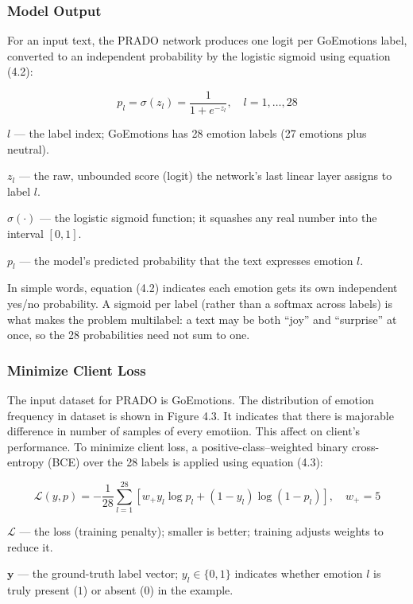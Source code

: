 \subsubsection{Model Output}
For an input text, the PRADO network produces one logit  per GoEmotions label, converted to an independent probability by the logistic sigmoid using equation (4.2):

\begin{equation}
  p_{l} = \sigma(z_{l}) = \frac{1}{1 + e^{-z_{l}}}, \quad l = 1, \ldots, 28
  \label{eq:ch4_4_2}
\end{equation}

$l$ --- the label index; GoEmotions has 28 emotion labels (27 emotions plus neutral).

$z_{l}$ --- the raw, unbounded score (logit) the network’s last linear layer assigns to label $l$.

$\sigma(\cdot)$ --- the logistic sigmoid function; it squashes any real number into the interval $[0,1]$.

$p_{l}$ --- the model’s predicted probability that the text expresses emotion $l$.

In simple words, equation (4.2) indicates each emotion gets its own independent yes/no probability. A sigmoid per label (rather than a softmax across labels) is what makes the problem multilabel: a text may be both “joy” and “surprise” at once, so the 28 probabilities need not sum to one.

\subsubsection{Minimize Client Loss}
The input dataset for PRADO is GoEmotions. The distribution of emotion frequency in dataset is shown in Figure 4.3. It indicates that there is majorable difference in number of samples of every emotiion. This affect on client’s performance. To minimize client loss, a positive-class--weighted binary cross-entropy (BCE) over the 28 labels is applied using equation (4.3):

\begin{equation}
  \mathcal{L}(y, p) = -\frac{1}{28} \sum_{l=1}^{28} \left[ w_{+} y_{l} \log p_{l} + (1 - y_{l}) \log(1 - p_{l}) \right], \quad w_{+} = 5
  \label{eq:ch4_4_3}
\end{equation}

$\mathcal{L}$ --- the loss (training penalty); smaller is better; training adjusts weights to reduce it.

$\mathbf{y}$ --- the ground-truth label vector; $y_{l} \in \{0, 1\}$ indicates whether emotion $l$ is truly present ($1$) or absent ($0$) in the example.


